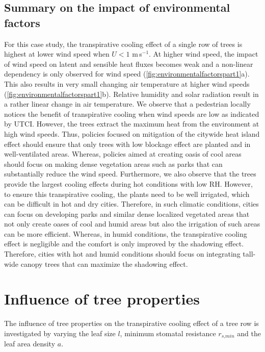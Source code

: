 \subsection{Summary on the impact of environmental factors}

For this case study, the transpirative cooling effect of a single row of trees is highest at lower wind speed when $U < 1$ m\,s$^{-1}$. At higher wind speed, the impact of wind speed on latent and sensible heat fluxes becomes weak and a non-linear dependency is only observed for wind speed (\cref{fig:environmentalfactorspart1}a). This also results in very small changing air temperature at higher wind speeds (\cref{fig:environmentalfactorspart1}b). Relative humidity and solar radiation result in a rather linear change in air temperature. We observe that a pedestrian locally notices the benefit of transpirative cooling when wind speeds are low as indicated by UTCI. However, the trees extract the maximum heat from the environment at high wind speeds. Thus, policies focused on mitigation of the citywide heat island effect should ensure that only trees with low blockage effect are planted and in well-ventilated areas. Whereas, policies aimed at creating oasis of cool areas should focus on making dense vegetation areas such as parks that can substantially reduce the wind speed. Furthermore, we also observe that the trees provide the largest cooling effects during hot conditions with low RH. However, to ensure this transpirative cooling, the plants need to be well irrigated, which can be difficult in hot and dry cities. Therefore, in such climatic conditions, cities can focus on developing parks and similar dense localized vegetated areas that not only create oases of cool and humid areas but also the irrigation of such areas can be more efficient. Whereas, in humid conditions, the transpirative cooling effect is negligible and the comfort is only improved by the shadowing effect. Therefore, cities with hot and humid conditions should focus on integrating tall-wide canopy trees that can maximize the shadowing effect. 

\section{Influence of tree properties}

The influence of tree properties on the transpirative cooling effect of a tree row is investigated by varying the leaf size $l$, minimum stomatal resistance $r_{\textit{s,min}}$ and the leaf area density $a$. 

